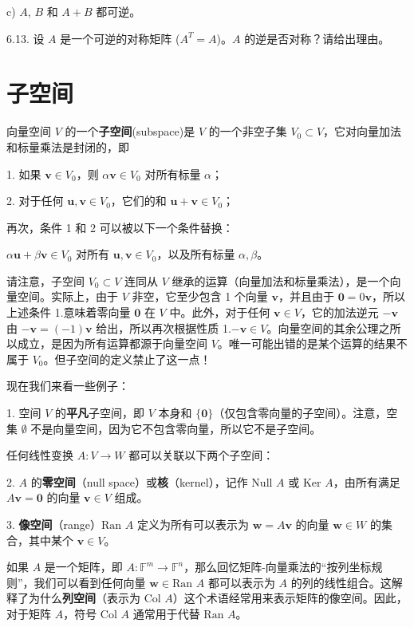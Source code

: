 c) $A$, $B$ 和 $A+B$ 都可逆。

6.13. 设 $A$ 是一个可逆的对称矩阵 ($A^T = A$)。$A$ 的逆是否对称？请给出理由。


\section{子空间}

向量空间 $V$ 的一个\textbf{子空间}(subspace)是 $V$ 的一个非空子集 $V_0 \subset V$，它对向量加法和标量乘法是封闭的，即

1. 如果 $\mathbf{v} \in V_0$，则 $\alpha \mathbf{v} \in V_0$ 对所有标量 $\alpha$；

2. 对于任何 $\mathbf{u}, \mathbf{v} \in V_0$，它们的和 $\mathbf{u} + \mathbf{v} \in V_0$；

再次，条件 1 和 2 可以被以下一个条件替换：

$\alpha \mathbf{u} + \beta \mathbf{v} \in V_0$ 对所有 $\mathbf{u}, \mathbf{v} \in V_0$，以及所有标量 $\alpha, \beta$。

请注意，子空间 $V_0 \subset V$ 连同从 $V$ 继承的运算（向量加法和标量乘法），是一个向量空间。实际上，由于 $V$ 非空，它至少包含 1 个向量 $\mathbf{v}$，并且由于 $\mathbf{0} = 0\mathbf{v}$，所以上述条件 1.意味着零向量 $\mathbf{0}$ 在 $V$ 中。此外，对于任何 $\mathbf{v} \in V$，它的加法逆元 $-\mathbf{v}$ 由 $-\mathbf{v} = (-1)\mathbf{v}$ 给出，所以再次根据性质 1.$-\mathbf{v} \in V$。向量空间的其余公理之所以成立，是因为所有运算都源于向量空间 $V$。唯一可能出错的是某个运算的结果不属于 $V_0$。但子空间的定义禁止了这一点！

现在我们来看一些例子：

1. 空间 $V$ 的\textbf{平凡}子空间，即 $V$ 本身和 $\{\mathbf{0}\}$（仅包含零向量的子空间）。注意，空集 $\emptyset$ 不是向量空间，因为它不包含零向量，所以它不是子空间。

任何线性变换 $A: V \to W$ 都可以关联以下两个子空间：

2. $A$ 的\textbf{零空间}（null space）或\textbf{核}（kernel），记作 $\text{Null } A$ 或 $\text{Ker } A$，由所有满足 $A \mathbf{v} = \mathbf{0}$ 的向量 $\mathbf{v} \in V$ 组成。

3. \textbf{像空间}（range）$\text{Ran } A$ 定义为所有可以表示为 $\mathbf{w} = A \mathbf{v}$ 的向量 $\mathbf{w} \in W$ 的集合，其中某个 $\mathbf{v} \in V$。

如果 $A$ 是一个矩阵，即 $A: \mathbb{F}^m \to \mathbb{F}^n$，那么回忆矩阵-向量乘法的“按列坐标规则”，我们可以看到任何向量 $\mathbf{w} \in \text{Ran } A$ 都可以表示为 $A$ 的列的线性组合。这解释了为什么\textbf{列空间}（表示为 $\text{Col } A$）这个术语经常用来表示矩阵的像空间。因此，对于矩阵 $A$，符号 $\text{Col } A$ 通常用于代替 $\text{Ran } A$。

